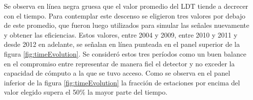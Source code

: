 	Se observa en línea negra gruesa que el valor promedio del LDT tiende a decrecer con el tiempo.
	Para contemplar este descenso se eligieron tres valores por debajo de este promedio, que fueron luego utilizados para simular las se\~nales nuevamente y obtener las eficiencias.
	Estos valores,  entre 2004 y 2009,  entre 2010 y 2011 y  desde 2012 en adelante, se señalan en línea punteada en el panel superior de la figura \ref{fig:timeEvolution}.
	Se consideró estos tres períodos como un buen balance en el compromiso entre representar de manera fiel el detector y no exceder la capacidad de cómputo a la que se tuvo acceso.
	Como se observa en el panel inferior de la figura \ref{fig:timeEvolution} la fracción de estaciones por encima del valor elegido supera el 50$\%$ la mayor parte del tiempo.
	
